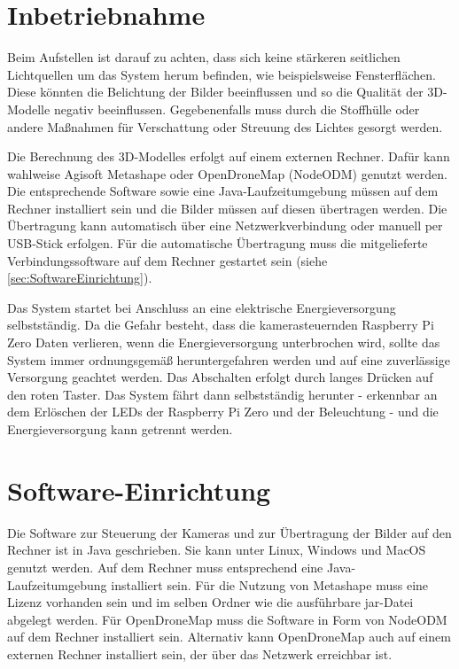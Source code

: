 \documentclass[./00PhotoBox.tex]{subfiles}
\begin{document}
\section{Inbetriebnahme}
Beim Aufstellen ist darauf zu achten, dass sich keine stärkeren seitlichen Lichtquellen um das System herum befinden, wie beispielsweise Fensterflächen. Diese könnten die Belichtung der Bilder beeinflussen und so die Qualität der 3D-Modelle negativ beeinflussen. Gegebenenfalls muss durch die Stoffhülle oder andere Maßnahmen für Verschattung oder Streuung des Lichtes gesorgt werden.

Die Berechnung des 3D-Modelles erfolgt auf einem externen Rechner. Dafür kann wahlweise Agisoft Metashape oder OpenDroneMap (NodeODM) genutzt werden. Die entsprechende Software sowie eine Java-Laufzeitumgebung müssen auf dem Rechner installiert sein und die Bilder müssen auf diesen übertragen werden. Die Übertragung kann au\-to\-ma\-tisch über eine Netzwerkverbindung oder manuell per USB-Stick erfolgen. Für die au\-to\-ma\-tische Übertragung muss die mitgelieferte Verbindungssoftware auf dem Rechner gestartet sein (siehe \autoref{sec:SoftwareEinrichtung}).

Das System startet bei Anschluss an eine elektrische Energieversorgung selbstständig. Da die Gefahr besteht, dass die kamerasteuernden Raspberry Pi Zero Daten verlieren, wenn die Energieversorgung unterbrochen wird, sollte das System immer ordnungsgemäß heruntergefahren werden und auf eine zuverlässige Versorgung geachtet werden.
Das Abschalten erfolgt durch langes Drücken auf den roten Taster. Das System fährt dann selbstständig herunter - erkennbar an dem Erlöschen der LEDs der Raspberry Pi Zero und der Beleuchtung - und die Energieversorgung kann getrennt werden.

\section{Software-Einrichtung}
\label{sec:SoftwareEinrichtung}
Die Software zur Steuerung der Kameras und zur Übertragung der Bilder auf den Rechner ist in Java geschrieben. Sie kann unter Linux, Windows und MacOS genutzt werden. Auf dem Rechner muss entsprechend eine Java-Laufzeitumgebung installiert sein. Für die Nutzung von Metashape muss eine Lizenz vorhanden sein und im selben Ordner wie die ausführbare jar-Datei abgelegt werden. Für OpenDroneMap muss die Software in Form von NodeODM auf dem Rechner installiert sein. Alternativ kann OpenDroneMap auch auf einem externen Rechner installiert sein, der über das Netzwerk erreichbar ist.
\end{document}
